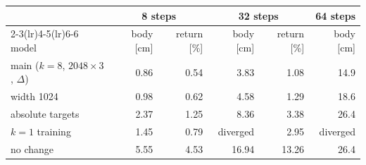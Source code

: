\begin{tabular}{lrrrrr}\toprule
 & \multicolumn{2}{c}{8 steps} & \multicolumn{2}{c}{32 steps} & 64 steps \\
\cmidrule(lr){2-3}\cmidrule(lr){4-5}\cmidrule(lr){6-6}
model & body [cm] & return [\%] & body [cm] & return [\%] & body [cm] \\\midrule
main ($k{=}8$, $2048{\times}3$, $\Delta$) & 0.86 & 0.54 & 3.83 & 1.08 & 14.9 \\
width 1024 & 0.98 & 0.62 & 4.58 & 1.29 & 18.6 \\
absolute targets & 2.37 & 1.25 & 8.36 & 3.38 & 26.4 \\
$k{=}1$ training & 1.45 & 0.79 & diverged & 2.95 & diverged \\
no change & 5.55 & 4.53 & 16.94 & 13.26 & 26.4 \\
\bottomrule\end{tabular}
